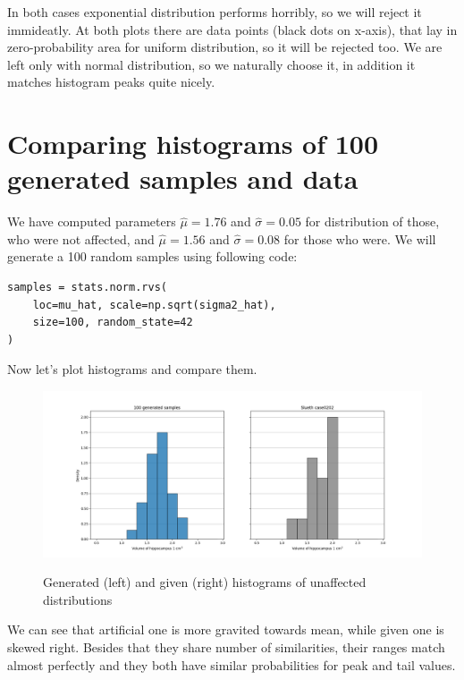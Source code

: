 \documentclass[12pt,a4paper]{article} %
\begin{document}
In both cases exponential distribution performs horribly, so we will reject it immideatly. At both plots there are data points (black dots on x-axis), that lay in zero-probability area for uniform distribution, so it will be rejected too. We are left only with normal distribution, so we naturally choose it, in addition it matches histogram peaks quite nicely.
\newpage

\section{Comparing histograms of 100 generated samples and data}

We have computed parameters $\hat\mu = 1.76$ and $\hat \sigma = 0.05$ for distribution of those, who were not affected, and $\hat\mu = 1.56$ and $\hat\sigma = 0.08$ for those who were. We will generate a 100 random samples using following code:

\begin{lstlisting}
samples = stats.norm.rvs(
    loc=mu_hat, scale=np.sqrt(sigma2_hat),
    size=100, random_state=42
)
\end{lstlisting}

Now let's plot histograms and compare them.

\begin{figure}[h]
  \centering
  \includegraphics[width=\textwidth]{./img/comparing_generated_unaffected.png}
  \label{fig:comp_gen_unaff}
  \caption{Generated (left) and given (right) histograms of unaffected distributions}
\end{figure}

We can see that artificial one is more gravited towards mean, while given one is skewed right. Besides that they share number of similarities, their ranges match almost perfectly and they both have similar probabilities for peak and tail values.
\end{document}

